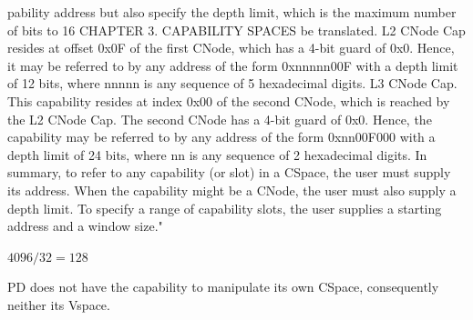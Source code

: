 pability address but also specify the depth limit, which is the maximum number of bits to
16 CHAPTER 3. CAPABILITY SPACES
be translated. L2 CNode Cap resides at offset 0x0F of the first CNode, which has a 4-bit
guard of 0x0. Hence, it may be referred to by any address of the form 0xnnnnn00F with a
depth limit of 12 bits, where nnnnn is any sequence of 5 hexadecimal digits.
L3 CNode Cap. This capability resides at index 0x00 of the second CNode, which is reached by
the L2 CNode Cap. The second CNode has a 4-bit guard of 0x0. Hence, the capability may
be referred to by any address of the form 0xnn00F000 with a depth limit of 24 bits, where
nn is any sequence of 2 hexadecimal digits.
In summary, to refer to any capability (or slot) in a CSpace, the user must supply its address.
When the capability might be a CNode, the user must also supply a depth limit. To specify a
range of capability slots, the user supplies a starting address and a window size.\cite{seL4:2024}" 


$4096 / 32 = 128$



PD does not have the capability to manipulate its own CSpace, consequently neither its Vspace.
